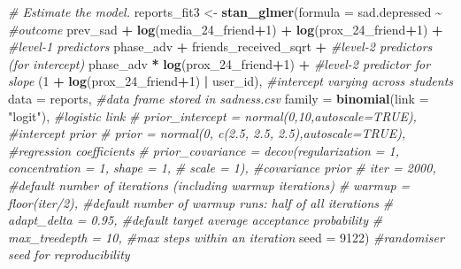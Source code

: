 \documentclass[
  english,
  doc]{apa6}
\newenvironment{Shaded}{\begin{snugshade}}{\end{snugshade}}
\newcommand{\CommentTok}[1]{\textcolor[rgb]{0.56,0.35,0.01}{\textit{#1}}}
\newcommand{\DataTypeTok}[1]{\textcolor[rgb]{0.13,0.29,0.53}{#1}}
\newcommand{\DecValTok}[1]{\textcolor[rgb]{0.00,0.00,0.81}{#1}}
\newcommand{\KeywordTok}[1]{\textcolor[rgb]{0.13,0.29,0.53}{\textbf{#1}}}
\newcommand{\NormalTok}[1]{#1}
\newcommand{\OperatorTok}[1]{\textcolor[rgb]{0.81,0.36,0.00}{\textbf{#1}}}
\newcommand{\StringTok}[1]{\textcolor[rgb]{0.31,0.60,0.02}{#1}}
\begin{document}
\begin{Shaded}
\begin{Highlighting}[]
\CommentTok{\# Estimate the model.}
\NormalTok{reports\_fit3 \textless{}{-}}\StringTok{ }\KeywordTok{stan\_glmer}\NormalTok{(}\DataTypeTok{formula =}\NormalTok{ sad.depressed }\OperatorTok{\textasciitilde{}}\StringTok{  }\CommentTok{\#outcome}
\StringTok{  }\NormalTok{prev\_sad }\OperatorTok{+}\StringTok{ }\KeywordTok{log}\NormalTok{(media\_}\DecValTok{24}\NormalTok{\_friend}\OperatorTok{+}\DecValTok{1}\NormalTok{) }\OperatorTok{+}\StringTok{ }\KeywordTok{log}\NormalTok{(prox\_}\DecValTok{24}\NormalTok{\_friend}\OperatorTok{+}\DecValTok{1}\NormalTok{) }\OperatorTok{+}\StringTok{ }\CommentTok{\#level{-}1 predictors}
\StringTok{  }\NormalTok{phase\_adv }\OperatorTok{+}\StringTok{ }\NormalTok{friends\_received\_sqrt }\OperatorTok{+}\StringTok{ }\CommentTok{\#level{-}2 predictors (for intercept)}
\StringTok{  }\NormalTok{phase\_adv }\OperatorTok{*}\StringTok{ }\KeywordTok{log}\NormalTok{(prox\_}\DecValTok{24}\NormalTok{\_friend}\OperatorTok{+}\DecValTok{1}\NormalTok{) }\OperatorTok{+}\StringTok{ }\CommentTok{\#level{-}2 predictor for slope}
\StringTok{  }\NormalTok{(}\DecValTok{1} \OperatorTok{+}\StringTok{ }\KeywordTok{log}\NormalTok{(prox\_}\DecValTok{24}\NormalTok{\_friend}\OperatorTok{+}\DecValTok{1}\NormalTok{) }\OperatorTok{|}\StringTok{ }\NormalTok{user\_id), }\CommentTok{\#intercept varying across students}
  \DataTypeTok{data =}\NormalTok{ reports, }\CommentTok{\#data frame stored in sadness.csv}
  \DataTypeTok{family =} \KeywordTok{binomial}\NormalTok{(}\DataTypeTok{link =} \StringTok{"logit"}\NormalTok{), }\CommentTok{\#logistic link}
  \CommentTok{\# prior\_intercept = normal(0,10,autoscale=TRUE), \#intercept prior}
  \CommentTok{\# prior = normal(0, c(2.5, 2.5, 2.5),autoscale=TRUE), \#regression coefficients}
  \CommentTok{\# prior\_covariance = decov(regularization = 1, concentration = 1, shape = 1,}
  \CommentTok{\# scale = 1), \#covariance prior}
  \CommentTok{\# iter = 2000, \#default number of iterations (including warmup iterations)}
  \CommentTok{\# warmup = floor(iter/2), \#default number of warmup runs: half of all iterations}
  \CommentTok{\# adapt\_delta = 0.95, \#default target average acceptance probability}
  \CommentTok{\# max\_treedepth = 10, \#max steps within an iteration}
  \DataTypeTok{seed =} \DecValTok{9122}\NormalTok{) }\CommentTok{\#randomiser seed for reproducibility}
\end{Highlighting}
\end{Shaded}
\end{document}
